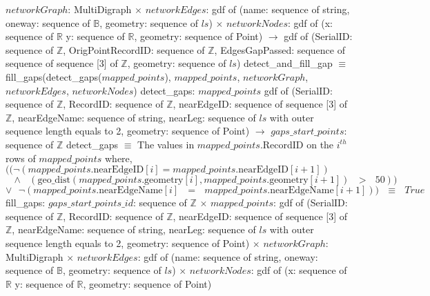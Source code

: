 \documentclass[12pt, titlepage]{article}
\begin{document}
$networkGraph$: MultiDigraph $\times$ $networkEdges$: gdf of (name: sequence of string, oneway: sequence of $\mathbb{B}$, geometry: sequence of $ls$) $\times$ $networkNodes$: gdf of (x: sequence of $\mathbb{R}$  y: sequence of $\mathbb{R}$, geometry: sequence of Point) \newline $\rightarrow$ \newline gdf of (SerialID: sequence of $\mathbb{Z}$, OrigPointRecordID: sequence of $\mathbb{Z}$, EdgesGapPassed: sequence of sequence of sequence [3] of $\mathbb{Z}$, geometry: sequence of $ls$)\newline
detect\_and\_fill\_gap $\equiv$ fill\_gaps(detect\_gaps($mapped\_points$), $mapped\_points$, $networkGraph$, $networkEdges$, $networkNodes$)\newline\newline
detect\_gaps: \newline
$mapped\_points$ gdf of (SerialID: sequence of $\mathbb{Z}$, RecordID: sequence of $\mathbb{Z}$, nearEdgeID: sequence of sequence [3] of $\mathbb{Z}$, nearEdgeName: sequence of string, nearLeg: sequence of $ls$ with outer sequence length equals to 2, geometry: sequence of Point) $\rightarrow$ $gaps\_start\_points$: sequence of $\mathbb{Z}$
detect\_gaps $\equiv$ The values in $mapped\_points$.RecordID on the $i^{th}$ rows of $mapped\_points$ where, \newline $((\neg (mapped\_points\text{.nearEdgeID}[i] =mapped\_points\text{.nearEdgeID}[i+1])$\newline
$\text{    }\land\text{ }(\text{geo\_dist}(mapped\_points\text{.geometry}[i],mapped\_points\text{.geometry}[i+1])\text{ }>\text{ }50))$\newline$\lor\text{ }\neg(mapped\_points\text{.nearEdgeName}[i]\text{ }=\text{ }mapped\_points\text{.nearEdgeName}[i+1]))\text{ }\equiv\text{ }True$\newline\newline
fill\_gaps: $gaps\_start\_points\_id$: sequence of $\mathbb{Z}$ $\times$ $mapped\_points$: gdf of (SerialID: sequence of $\mathbb{Z}$, RecordID: sequence of $\mathbb{Z}$, nearEdgeID: sequence of sequence [3] of $\mathbb{Z}$, nearEdgeName: sequence of string, nearLeg: sequence of $ls$ with outer sequence length equals to 2, geometry: sequence of Point) $\times$ 
$networkGraph$: MultiDigraph $\times$ $networkEdges$: gdf of (name: sequence of string, oneway: sequence of $\mathbb{B}$, geometry: sequence of $ls$) $\times$ $networkNodes$: gdf of (x: sequence of $\mathbb{R}$  y: sequence of $\mathbb{R}$, geometry: sequence of Point)
\end{document}
